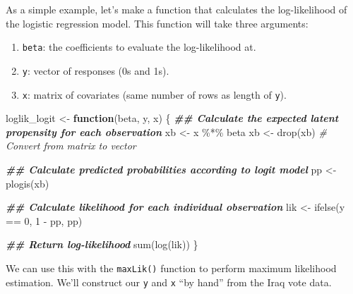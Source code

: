 \documentclass[
  12pt,
  oneside,openany]{book}
\newenvironment{Shaded}{\begin{snugshade}}{\end{snugshade}}
\newcommand{\CommentTok}[1]{\textcolor[rgb]{0.56,0.35,0.01}{\textit{#1}}}
\newcommand{\ControlFlowTok}[1]{\textcolor[rgb]{0.13,0.29,0.53}{\textbf{#1}}}
\newcommand{\DecValTok}[1]{\textcolor[rgb]{0.00,0.00,0.81}{#1}}
\newcommand{\DocumentationTok}[1]{\textcolor[rgb]{0.56,0.35,0.01}{\textbf{\textit{#1}}}}
\newcommand{\FunctionTok}[1]{\textcolor[rgb]{0.00,0.00,0.00}{#1}}
\newcommand{\NormalTok}[1]{#1}
\newcommand{\OtherTok}[1]{\textcolor[rgb]{0.56,0.35,0.01}{#1}}
\newcommand{\SpecialCharTok}[1]{\textcolor[rgb]{0.00,0.00,0.00}{#1}}
\providecommand{\tightlist}{%
  \setlength{\itemsep}{0pt}\setlength{\parskip}{0pt}}
\begin{document}
As a simple example, let's make a function that calculates the log-likelihood of the logistic regression model.
This function will take three arguments:

\begin{enumerate}
\def\labelenumi{\arabic{enumi}.}
\tightlist
\item
  \texttt{beta}: the coefficients to evaluate the log-likelihood at.
\item
  \texttt{y}: vector of responses (0s and 1s).
\item
  \texttt{x}: matrix of covariates (same number of rows as length of \texttt{y}).
\end{enumerate}

\begin{Shaded}
\begin{Highlighting}[]
\NormalTok{loglik\_logit }\OtherTok{\textless{}{-}} \ControlFlowTok{function}\NormalTok{(beta, y, x) \{}
  \DocumentationTok{\#\# Calculate the expected latent propensity for each observation}
\NormalTok{  xb }\OtherTok{\textless{}{-}}\NormalTok{ x }\SpecialCharTok{\%*\%}\NormalTok{ beta}
\NormalTok{  xb }\OtherTok{\textless{}{-}} \FunctionTok{drop}\NormalTok{(xb)  }\CommentTok{\# Convert from matrix to vector}

  \DocumentationTok{\#\# Calculate predicted probabilities according to logit model}
\NormalTok{  pp }\OtherTok{\textless{}{-}} \FunctionTok{plogis}\NormalTok{(xb)}

  \DocumentationTok{\#\# Calculate likelihood for each individual observation}
\NormalTok{  lik }\OtherTok{\textless{}{-}} \FunctionTok{ifelse}\NormalTok{(y }\SpecialCharTok{==} \DecValTok{0}\NormalTok{, }\DecValTok{1} \SpecialCharTok{{-}}\NormalTok{ pp, pp)}

  \DocumentationTok{\#\# Return log{-}likelihood}
  \FunctionTok{sum}\NormalTok{(}\FunctionTok{log}\NormalTok{(lik))}
\NormalTok{\}}
\end{Highlighting}
\end{Shaded}

We can use this with the \texttt{maxLik()} function to perform maximum likelihood estimation.
We'll construct our \texttt{y} and \texttt{x} ``by hand'' from the Iraq vote data.

\begin{Shaded}
\end{Shaded}
\end{document}
